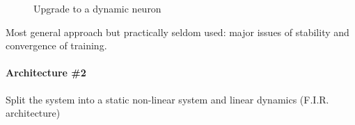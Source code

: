 \begin{figure}[H]
\begin{minipage}[t]{0.48\textwidth}
        \caption*{Upgrade to a dynamic neuron}
    \end{minipage}
\end{figure}

Most general approach but practically seldom used: major issues of stability and convergence of training.

\paragraph{Architecture \#2} Split the system into a static non-linear system and linear dynamics (F.I.R. architecture)

